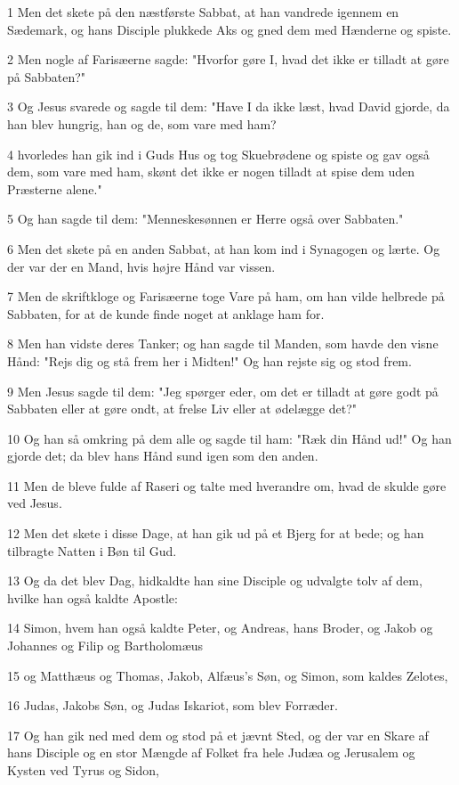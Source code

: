 \par 1 Men det skete på den næstførste Sabbat, at han vandrede igennem en Sædemark, og hans Disciple plukkede Aks og gned dem med Hænderne og spiste.
\par 2 Men nogle af Farisæerne sagde: "Hvorfor gøre I, hvad det ikke er tilladt at gøre på Sabbaten?"
\par 3 Og Jesus svarede og sagde til dem: "Have I da ikke læst, hvad David gjorde, da han blev hungrig, han og de, som vare med ham?
\par 4 hvorledes han gik ind i Guds Hus og tog Skuebrødene og spiste og gav også dem, som vare med ham, skønt det ikke er nogen tilladt at spise dem uden Præsterne alene."
\par 5 Og han sagde til dem: "Menneskesønnen er Herre også over Sabbaten."
\par 6 Men det skete på en anden Sabbat, at han kom ind i Synagogen og lærte. Og der var der en Mand, hvis højre Hånd var vissen.
\par 7 Men de skriftkloge og Farisæerne toge Vare på ham, om han vilde helbrede på Sabbaten, for at de kunde finde noget at anklage ham for.
\par 8 Men han vidste deres Tanker; og han sagde til Manden, som havde den visne Hånd: "Rejs dig og stå frem her i Midten!" Og han rejste sig og stod frem.
\par 9 Men Jesus sagde til dem: "Jeg spørger eder, om det er tilladt at gøre godt på Sabbaten eller at gøre ondt, at frelse Liv eller at ødelægge det?"
\par 10 Og han så omkring på dem alle og sagde til ham: "Ræk din Hånd ud!" Og han gjorde det; da blev hans Hånd sund igen som den anden.
\par 11 Men de bleve fulde af Raseri og talte med hverandre om, hvad de skulde gøre ved Jesus.
\par 12 Men det skete i disse Dage, at han gik ud på et Bjerg for at bede; og han tilbragte Natten i Bøn til Gud.
\par 13 Og da det blev Dag, hidkaldte han sine Disciple og udvalgte tolv af dem, hvilke han også kaldte Apostle:
\par 14 Simon, hvem han også kaldte Peter, og Andreas, hans Broder, og Jakob og Johannes og Filip og Bartholomæus
\par 15 og Matthæus og Thomas, Jakob, Alfæus's Søn, og Simon, som kaldes Zelotes,
\par 16 Judas, Jakobs Søn, og Judas Iskariot, som blev Forræder.
\par 17 Og han gik ned med dem og stod på et jævnt Sted, og der var en Skare af hans Disciple og en stor Mængde af Folket fra hele Judæa og Jerusalem og Kysten ved Tyrus og Sidon,
